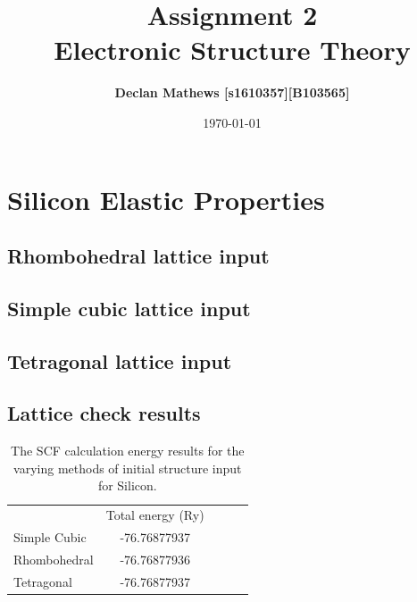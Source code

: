 \documentclass[12pt]{article}
\title{\bf Assignment 2 \\[2ex] 
	\rm\normalsize Electronic Structure Theory}
\date{\today}
\author{\bf Declan Mathews [s1610357][B103565]}
\begin{document}
	\maketitle
	
\section*{Silicon Elastic Properties}
\subsection*{Rhombohedral lattice input}



\subsection*{Simple cubic lattice input}



\subsection*{Tetragonal lattice input}



\subsection*{Lattice check results}
\begin{table}[h!!!!]
	\centering
\begin{tabular}{c|c|cll}
	\cline{2-2}
	& Total energy (Ry) &  &  &  \\ \cline{1-2}
	\multicolumn{1}{|l|}{Simple Cubic} & -76.76877937      &  &  &  \\ \cline{1-2}
	\multicolumn{1}{|l|}{Rhombohedral} & -76.76877936      &  &  &  \\ \cline{1-2}
	\multicolumn{1}{|l|}{Tetragonal}   & -76.76877937      &  &  &  \\ \cline{1-2}
\end{tabular}
\caption{The SCF calculation energy results for the varying methods of initial structure input for Silicon.}
\label{tab:lattice-check}
\end{table}
\end{document}
